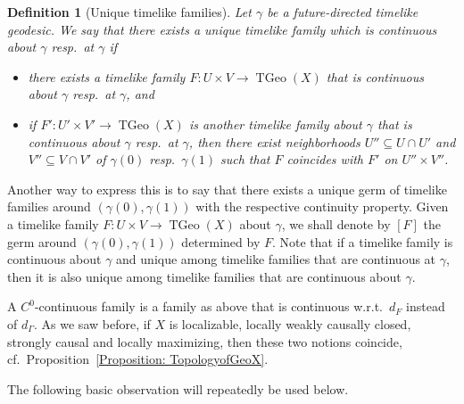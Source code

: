 \documentclass[a4paper,11pt]{article}
\numberwithin{equation}{section}
\theoremstyle{plain}
\newtheorem{Definition}{Definition}[section]
\theoremstyle{definition}
\DeclareMathOperator{\TGeo}{TGeo}
\begin{document}
\begin{Definition}[Unique timelike families]\label{def:unique_familiy}
Let $\gamma$ be a future-directed timelike geodesic. We say that there exists a unique timelike
family which is continuous about $\gamma$ resp.\ at $\gamma$ if
\begin{itemize}
\item[(i)] there exists a timelike family $F \colon U\times V \to \TGeo(X)$ that is continuous about $\gamma$ resp.\ at $\gamma$, and
\item[(ii)] if $F' \colon U' \times V' \to \TGeo(X)$ is another timelike family about $\gamma$ that is continuous about $\gamma$ resp.\ at $\gamma$, then there exist neighborhoods $U''\subseteq U\cap U'$ and $V''\subseteq V\cap V'$ of $\gamma(0)$
resp.\ $\gamma(1)$ such that $F$ coincides with $F'$ on $U''\times V''$.
\end{itemize}
\end{Definition}

Another way to express this is to say that there exists a unique germ of timelike
families around $(\gamma(0), \gamma(1))$ with the respective continuity property. Given a timelike family $F \colon U\times V \to \TGeo(X)$ about $\gamma$, we shall denote by $[F]$ the germ around $(\gamma(0), \gamma(1))$ determined by $F$. Note that if a timelike family is continuous about $\gamma$ and unique among timelike families that are continuous at $\gamma$, then it is also unique among timelike families that are continuous about $\gamma$.

A $C^0$-continuous family is a family as above that is continuous w.r.t.\ $d_F$ instead of $d_{\Gamma}$. As we saw before, if $X$ is localizable, locally weakly causally closed, strongly causal and locally maximizing, then these two notions coincide, cf.\ Proposition~\ref{Proposition: TopologyofGeoX}. 

The following basic observation will repeatedly be used below.
\end{document}
